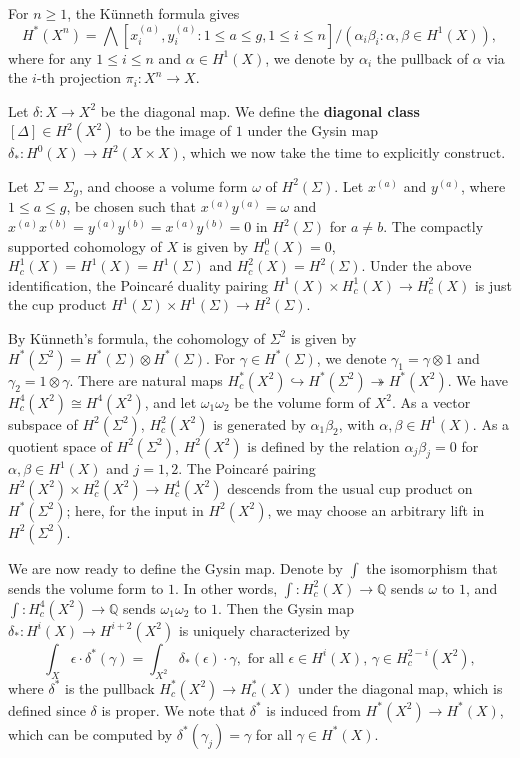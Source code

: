 \documentclass[11pt,reqno]{amsproc}
\numberwithin{equation}{section}
\theoremstyle{definition}
\theoremstyle{remark}
\newcommand\Q{{\mathbb Q}}
\newcommand\onto{\twoheadrightarrow}
\newcommand\incl{\hookrightarrow}
\newcommand{\spp}[1]{^{(#1)}}
\begin{document}
For $n\geq 1$, the K\"unneth formula gives 
\[
H^*(X^n)=\bigwedge[x\spp{a}_i,y\spp{a}_i: 1\leq a\leq g, 1\leq i\leq n]/(\alpha_i\beta_i: \alpha,\beta\in H^1(X)),
\]
where for any $1\leq i\leq n$ and $\alpha\in H^1(X)$, we denote by $\alpha_i$ the pullback of $\alpha$ via the $i$-th projection $\pi_i: X^n\to X$. 

Let $\delta:X\to X^2$ be the diagonal map. We define the \textbf{diagonal class} $[\Delta]\in H^2(X^2)$ to be the image of $1$ under the Gysin map $\delta_*:H^0(X)\to H^2(X\times X)$, which we now take the time to explicitly construct.

Let $\Sigma=\Sigma_g$, and choose a volume form $\omega$ of $H^2(\Sigma)$. Let $x\spp{a}$ and $y\spp{a}$, where $1\leq a\leq g$, be chosen such that $x\spp{a}y\spp{a}=\omega$ and $x\spp{a}x\spp{b}=y\spp{a}y\spp{b}=x\spp{a}y\spp{b}=0$ in $H^2(\Sigma)$ for $a\neq b$. The compactly supported cohomology of $X$ is given by $H^0_c(X)=0$,  $H^1_c(X)=H^1(X)=H^1(\Sigma)$ and $H^2_c(X)=H^2(\Sigma)$. Under the above identification, the Poincar\'e duality pairing $H^1(X)\times H^1_c(X)\to H^2_c(X)$ is just the cup product $H^1(\Sigma)\times H^1(\Sigma)\to H^2(\Sigma)$. 

By K\"unneth's formula, the cohomology of $\Sigma^2$ is given by $H^*(\Sigma^2)=H^*(\Sigma)\otimes H^*(\Sigma)$. For $\gamma\in H^*(\Sigma)$, we denote $\gamma_1=\gamma\otimes 1$ and $\gamma_2=1\otimes \gamma$. There are natural maps $H^*_c(X^2)\incl H^*(\Sigma^2)\onto H^*(X^2)$. We have $H^4_c(X^2)\cong H^4(X^2)$, and let $\omega_1\omega_2$ be the volume form of $X^2$. As a vector subspace of $H^2(\Sigma^2)$, $H^2_c(X^2)$ is generated by $\alpha_1 \beta_2$, with $\alpha,\beta\in H^1(X)$. As a quotient space of $H^2(\Sigma^2)$, $H^2(X^2)$ is defined by the relation $\alpha_j \beta_j=0$ for $\alpha,\beta\in H^1(X)$ and $j=1,2$. The Poincar\'e pairing $H^2(X^2)\times H^2_c(X^2)\to H^4_c(X^2)$ descends from the usual cup product on $H^*(\Sigma^2)$; here, for the input in $H^2(X^2)$, we may choose an arbitrary lift in $H^2(\Sigma^2)$.

We are now ready to define the Gysin map. Denote by $\int$ the isomorphism that sends the volume form to $1$. In other words, $\int: H^2_c(X)\to \Q$ sends $\omega$ to $1$, and $\int:H^4_c(X^2)\to \Q$ sends $\omega_1\omega_2$ to $1$. Then the Gysin map $\delta_*:H^i(X)\to H^{i+2}(X^2)$ is uniquely characterized by
\begin{equation}
\int_X \epsilon \cdot \delta^*(\gamma) = \int_{X^2} \delta_*(\epsilon) \cdot \gamma, \text{ for all }\epsilon\in H^i(X)\text{, }\gamma\in H^{2-i}_c(X^2),
\end{equation}
where $\delta^*$ is the pullback $H^*_c(X^2)\to H^*_c(X)$ under the diagonal map, which is defined since $\delta$ is proper. We note that $\delta^*$ is induced from $H^*(X^2)\to H^*(X)$, which can be computed by $\delta^*(\gamma_j)=\gamma$ for all $\gamma\in H^*(X)$.
\end{document}
